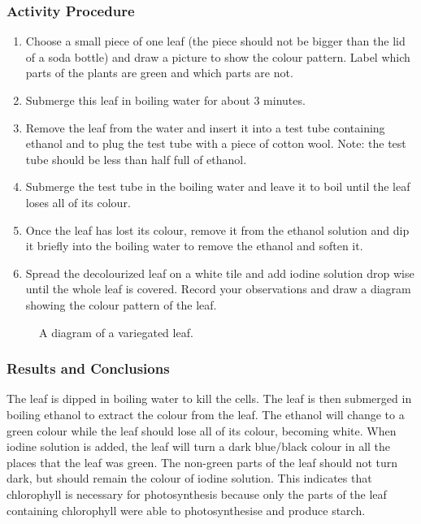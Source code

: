 \subsubsection*{Activity Procedure}
\begin{enumerate}
\item{Choose a small piece of one leaf (the piece should not be bigger than the lid of a soda bottle) and draw a picture to show the colour pattern. Label which parts of the plants are green and which parts are not.}
\item{Submerge this leaf in boiling water for about 3 minutes.}
\item{Remove the leaf from the water and insert it into a test tube containing ethanol and to plug the test tube with a piece of cotton wool. Note: the test tube should be less than half full of ethanol.}
\item{Submerge the test tube in the boiling water and leave it to boil until the leaf loses all of its colour.}
\item{Once the leaf has lost its colour, remove it from the ethanol solution and dip it briefly into the boiling water to remove the ethanol and soften it.}
\item{Spread the decolourized leaf on a white tile and add iodine solution drop wise until the whole leaf is covered. Record your observations and draw a diagram showing the colour pattern of the leaf.}
\end{enumerate}

\begin{figure}[h]
\begin{center}
\def\svgwidth{6cm}

\caption{A diagram of a variegated leaf.}
\label{fig:variegate leaf}
\end{center}
\end{figure}

\subsubsection*{Results and Conclusions}
The leaf is dipped in boiling water to kill the cells. The leaf is then submerged in boiling ethanol to extract the colour from the leaf. The ethanol will change to a green colour while the leaf should lose all of its colour, becoming white. When iodine solution is added, the leaf will turn a dark blue/black colour in all the places that the leaf was green. The non-green parts of the leaf should not turn dark, but should remain the colour of iodine solution. This indicates that chlorophyll is necessary for photosynthesis because only the parts of the leaf containing chlorophyll were able to photosynthesise and produce starch.


